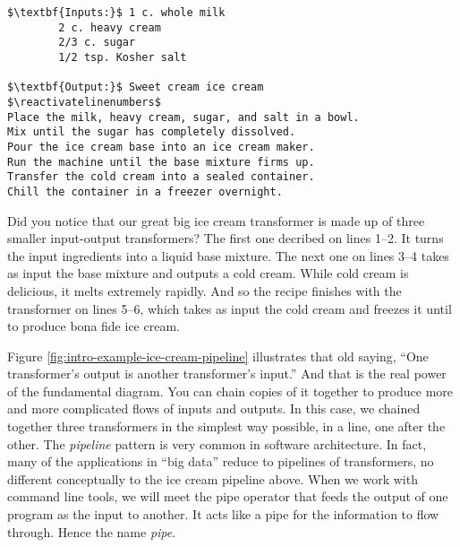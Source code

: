 \suppresslinenumbers
\begin{lstlisting}[caption={\label{listing:intro-ice-cream} Ice cream
transformer. It's as short as it is sweet.}, escapeinside=$$, firstnumber=0]
$\textbf{Inputs:}$ 1 c. whole milk
        2 c. heavy cream
        2/3 c. sugar
        1/2 tsp. Kosher salt

$\textbf{Output:}$ Sweet cream ice cream
$\reactivatelinenumbers$
Place the milk, heavy cream, sugar, and salt in a bowl.
Mix until the sugar has completely dissolved.
Pour the ice cream base into an ice cream maker.
Run the machine until the base mixture firms up.
Transfer the cold cream into a sealed container.
Chill the container in a freezer overnight.
\end{lstlisting}

Did you notice that our great big ice cream transformer is made up of three
smaller input-output transformers? The first one decribed on lines 1--2. It
turns the input ingredients into a liquid base mixture. The next one on lines
3--4 takes as input the base mixture and outputs a cold cream. While cold cream
is delicious, it melts extremely rapidly. And so the recipe finishes with the
transformer on lines 5--6, which takes as input the cold cream and freezes it
until to produce bona fide ice cream.

\begin{figure*}[h]
  
\caption{\label{fig:intro-example-ice-cream-pipeline} The steps inside
transformers are often simpler transformers. The transfromation that produces
ice cream from ingredients is made up of three successive transformers. The
output of one transformer is the input to the next transformer.}
\end{figure*}

Figure \ref{fig:intro-example-ice-cream-pipeline} illustrates that old saying,
``One transformer's output is another transformer's input.'' And that is the
real power of the fundamental diagram. You can chain copies of it together to
produce more and more complicated flows of inputs and outputs. In this case, we
chained together three transformers in the simplest way possible, in a line, one
after the other. The \emph{pipeline} pattern is very common in software
architecture. In fact, many of the applications in ``big data'' reduce to
pipelines of transformers, no different conceptually to the ice cream pipeline
above. When we work with command line tools, we will meet the pipe operator that
feeds the output of one program as the input to another. It acts like a pipe for the information to
flow through. Hence the name \emph{pipe}.

